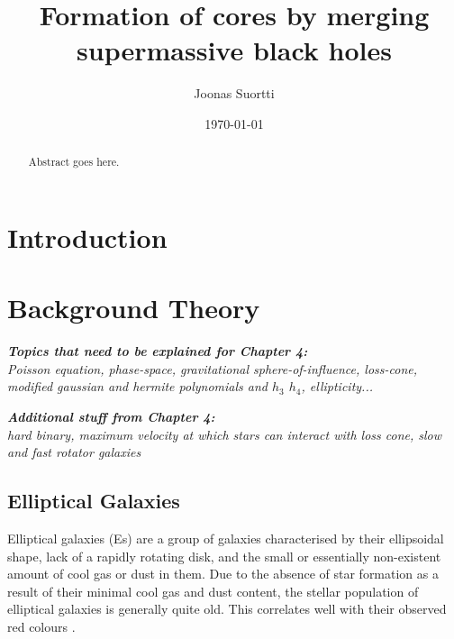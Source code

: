 \documentclass[english, oneside]{HYgradu}
\title{Formation of cores by merging supermassive black holes}
\author{Joonas Suortti}
\date{\today}
\begin{document}
\maketitle

\doublespacing

\begin{abstract}
Abstract goes here.
\end{abstract}

\mytableofcontents



\chapter{Introduction}

\chapter{Background Theory}

\textit{\textbf{Topics that need to be explained for Chapter 4:}
\\
Poisson equation, phase-space, gravitational sphere-of-influence, loss-cone, modified gaussian and hermite polynomials and $h_3$ $h_4$, ellipticity...}

\textit{\textbf{Additional stuff from Chapter 4:}
\\
hard binary, maximum velocity at which stars can interact with loss cone, slow and fast rotator galaxies}

\section{Elliptical Galaxies}

Elliptical galaxies (Es) are a group of galaxies characterised by their ellipsoidal shape, lack of a rapidly rotating disk, and the small or essentially non-existent amount of cool gas or dust in them. Due to the absence of star formation as a result of their minimal cool gas and dust content, the stellar population of elliptical galaxies is generally quite old. This correlates well with their observed red colours \citep{Cappellari2016}.
\end{document}
